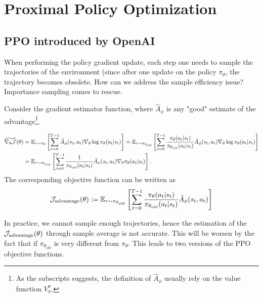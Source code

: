 \section{Proximal Policy Optimization}

\subsection{PPO introduced by OpenAI}
When performing the policy gradient update, each step one needs to sample the trajectories of the environment (since after one update on the policy $\pi_\theta$, the trajectory becomes obsolete. How can we address the sample efficiency issue? Importance sampling comes to rescue.


Consider the gradient estimator function, where $\hat A_\phi$ is any "good" estimate of the advantage\footnote{As the subscripts suggests, the definition of $\hat A_\phi$ usually rely on the value function $V^{\pi}_{\phi}$. }.

\begin{align*}
   \widetilde{\nabla_{\theta}{\cal J}}(\theta)
   & =\mathbb{E}_{\tau\sim \pi_{\theta}}\left[ \sum_{t=0}^{T-1} \hat A_\phi(s_t,a_t)\nabla_{\theta}\log\pi_{\theta}(a_t|s_t)\right] 
   =\mathbb{E}_{\tau\sim \pi_{\theta_{\text{old}}}}\left[ \sum_{t=0}^{T-1}\frac{\pi_{\theta}(a_t|s_t)}{\pi_{\theta_{\text{old}}}(a_t|s_t)} \hat A_\phi(s_t,a_t)\nabla_{\theta}\log\pi_{\theta}(a_t|s_t)\right] \\
   & = \mathbb{E}_{\tau\sim \pi_{\theta_{\text{old}}}}\left[ \sum_{t=0}^{T-1}\frac{1}{\pi_{\theta_{\text{old}}}(a_t|s_t)} \hat A_\phi(s_t,a_t)\nabla_{\theta}\pi_{\theta}(a_t|s_t)\right].
\end{align*}
The corresponding objective function can be written as 
\begin{align*}
   {\cal J}_{\text{advantage}}(\theta):= \mathbb{E}_{\tau\sim \pi_{\theta_{\text{old}}}}\left[ \sum_{t=0}^{T-1}  \frac{\pi_{\theta}(a_t|s_t)}{\pi_{\theta_{\text{old}}}(a_t|s_t)}\hat A_\phi(s_t,a_t)\right] 
\end{align*}

In practice,  we cannot sample enough trajectories, hence the estimation of the $ {\cal J}_{\text{advantage}}(\theta)$ through sample average is not accurate. This will be worsen by the fact that if $\pi_{\theta_{\text{old}}}$ is very different from $\pi_{\theta}$. This leads to two versions of the PPO objective functions.

